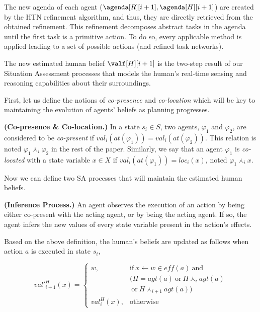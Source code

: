 {The new agenda of each agent ($\agenda[R][i+1], \agenda[H][i+1]$) are created by the HTN refinement algorithm, and thus, they are directly retrieved from the obtained refinement. 
This refinement decomposes abstract tasks in the agenda until the first task is a primitive action. To do so, every applicable method is applied leading to a set of possible actions (and refined task networks).

The new estimated human belief $\valf[H][i+1]$ is the two-step result of our Situation Assessment processes that models the human's real-time sensing and reasoning capabilities about their surroundings.

First, let us define the notions of \textit{co-presence} and \textit{co-location} which will be key to maintaining the evolution of agents' beliefs as planning progresses.

\begin{definition} \label{def:co-pre-loc}
    \textbf{(Co-presence \& Co-location.)} In a state $s_i \in S$, two agents, $\varphi_1$ and $\varphi_2$, are considered to be \textit{co-present} if $val_i(at(\varphi_1)) = val_i(at(\varphi_2))$. This relation is noted $\varphi_1 \curlywedge_i \varphi_2$ in the rest of the paper. Similarly, we say that an agent $\varphi_1$ is \textit{co-located} with a state variable $x \in X$ if $val_i(at(\varphi_1)) = loc_i(x)$, noted $\varphi_1 \curlywedge_i x$.
\end{definition}

Now we can define two SA processes that will maintain the estimated human beliefs.

\begin{definition} \label{def:new_inf}
    \textbf{(Inference Process.)} An agent observes the execution of an action by being either co-present with the acting agent, 
    or by being the acting agent. If so, the agent infers the new values of every state variable present in the action's effects.
\end{definition}

Based on the above definition, the human's beliefs are updated as follows when action $a$ is executed in state $s_i$, 

\begin{equation}
val'^H_{i+1}(x) = \left\{ 
\begin{array}{ll}
    w, & \mbox{if} ~ x \leftarrow w \in \textit{eff}(a) ~ \mbox{and}  \\ 
    & (H = \textit{agt}(a) ~\mbox{or}~ H \curlywedge_i \textit{agt}(a)\\
    & ~\mbox{or}~ H \curlywedge_{i+1} \textit{agt}(a))\\
    val^H_i(x), & \mbox{otherwise}
\end{array}\right.
\end{equation}

}

